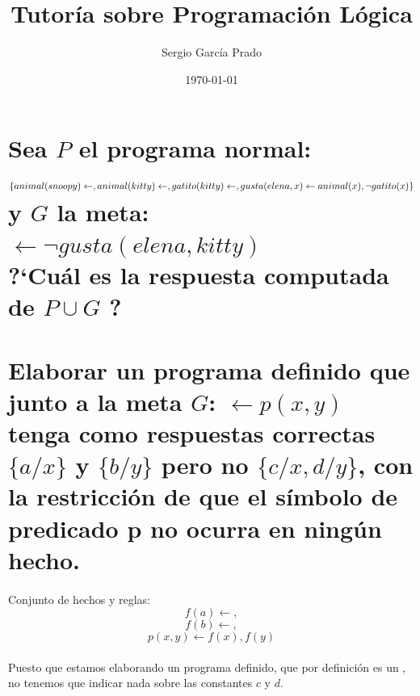 \documentclass[11pt, a4paper,spanish]{article}
\title{\vspace{-15mm}\fontsize{24.88pt}{10pt}\textbf{Tutoría sobre Programación Lógica}} %
\author{Sergio García Prado}
\date{\today}
\begin{document}
	\maketitle %

	\thispagestyle{fancy} %


	\section{Sea $P$ el programa normal: \\
		$\{animal(snoopy) \gets, \\
		animal(kitty) \gets, \\
		gatito(kitty) \gets, \\
		gusta(elena,x) \gets animal(x), \neg gatito(x)\}\\$
		y $G$ la meta: \\
		$\gets \neg gusta(elena,kitty)$\\
		?`Cuál es la respuesta computada de $P \cup {G}$ ?}

		\paragraph{}


	\section{Elaborar un programa definido que junto a la meta $G$: $\gets p(x,y)$ tenga como respuestas correctas $\{ a / x \}$ y $\{b / y\}$ pero no $\{c / x, d / y\}$, con la restricción de que el símbolo de predicado p no ocurra en ningún hecho.}

		\paragraph{}
		Conjunto de hechos y reglas:
		\[ f(a) \gets, \]
		\[ f(b) \gets, \]
		\[ p(x,y) \gets f(x), f(y) \]

		\paragraph{}
		Puesto que estamos elaborando un programa definido, que por definición es un  , no tenemos que indicar nada sobre las constantes $c$ y $d$.
\end{document}
